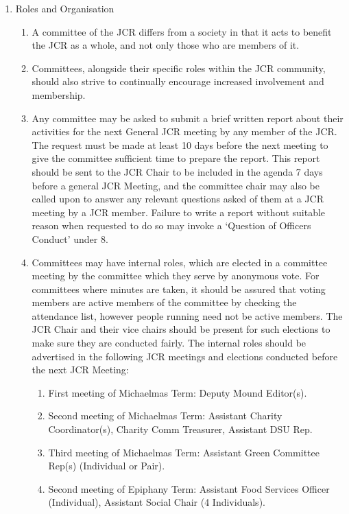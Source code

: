 \begin{enumerate}
    \item Roles and Organisation
    \begin{enumerate}
        \item A committee of the JCR differs from a society in that it acts to benefit the JCR as a whole, and not only those who are members of it.
        \item Committees, alongside their specific roles within the JCR community, should also strive to continually encourage increased involvement and membership.
        \item Any committee may be asked to submit a brief written report about their activities for the next General JCR meeting by any member of the JCR. The request must be made at least 10 days before the next meeting to give the committee sufficient time to prepare the report. This report should be sent to the JCR Chair to be included in the agenda 7 days before a general JCR Meeting, and the committee chair may also be called upon to answer any relevant questions asked of them at a JCR meeting by a JCR member. Failure to write a report without suitable reason when requested to do so may invoke a ‘Question of Officers Conduct’ under 8.
        \item Committees may have internal roles, which are elected in a committee meeting by the committee which they serve by anonymous vote. For committees where minutes are taken, it should be assured that voting members are active members of the committee by checking the attendance list, however people running need not be active members. The JCR Chair and their vice chairs should be present for such elections to make sure they are conducted fairly. The internal roles should be advertised in the following JCR meetings and elections conducted before the next JCR Meeting:
        \begin{enumerate}
            \item First meeting of Michaelmas Term: Deputy Mound Editor(s).
            \item Second meeting of Michaelmas Term: Assistant Charity Coordinator(s), Charity Comm
            Treasurer, Assistant DSU Rep.
            \item Third meeting of Michaelmas Term: Assistant Green Committee Rep(s) (Individual or Pair).
            \item Second meeting of Epiphany Term: Assistant Food Services Officer (Individual), Assistant Social Chair (4 Individuals).

\end{enumerate}
\end{enumerate}
\end{enumerate}

